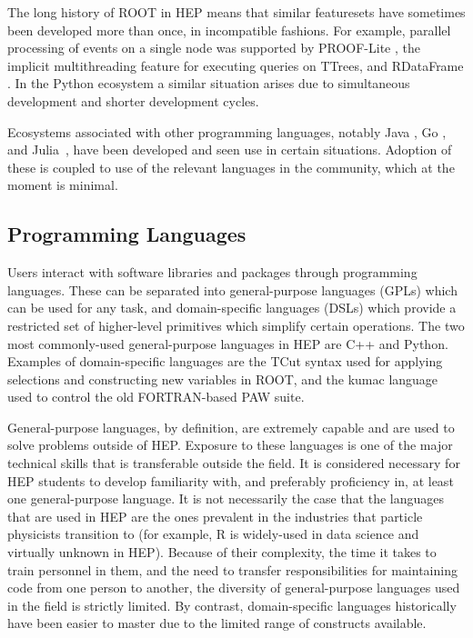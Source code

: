 The long history of ROOT in HEP means that similar featuresets have sometimes been developed more than once, in incompatible fashions. For example, parallel processing of events on a single node was supported by PROOF-Lite \cite{Ganis:2008zz}, the implicit multithreading feature for executing queries on TTrees, and RDataFrame \cite{Piparo:2019xdy}. In the Python ecosystem a similar situation arises due to simultaneous development and shorter development cycles.

Ecosystems associated with other programming languages, notably Java \cite{Chekanov:2020bja}, Go \cite{Binet:2018xcc}, and Julia~\cite{bezanson2017julia,Stanitzki:2020bnx,Gal:2022vnn}, have been developed and seen use in certain situations. Adoption of these is coupled to use of the relevant languages in the community, which at the moment is minimal.

\subsection{Programming Languages}
Users interact with software libraries and packages through programming languages. These can be separated into general-purpose languages (GPLs) which can be used for any task, and domain-specific languages (DSLs) which provide a restricted set of higher-level primitives which simplify certain operations. The two most commonly-used general-purpose languages in HEP are C++ and Python. Examples of domain-specific languages are the TCut syntax used for applying selections and constructing new variables in ROOT, and the kumac language used to control the old FORTRAN-based PAW suite.

General-purpose languages, by definition, are extremely capable and are used to solve problems outside of HEP. Exposure to these languages is one of the major technical skills that is transferable outside the field. It is considered necessary for HEP students to develop familiarity with, and preferably proficiency in, at least one general-purpose language. It is not necessarily the case that the languages that are used in HEP are the ones prevalent in the industries that particle physicists transition to (for example, R is widely-used in data science and virtually unknown in HEP). Because of their complexity, the time it takes to train personnel in them, and the need to transfer responsibilities for maintaining code from one person to another, the diversity of general-purpose languages used in the field is strictly limited. By contrast, domain-specific languages historically have been easier to master due to the limited range of constructs available.

